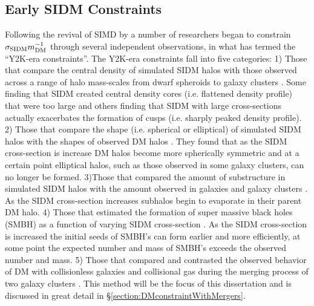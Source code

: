 \subsection{Early SIDM Constraints}

Following the revival of SIMD by \citet{Spergel:2000cb} a number of researchers began to constrain $\sigma_{\rm SIDM}m_{\rm DM}^{-1}$ through several independent observations, in what \citet{Peter:2012vi} has termed the ``Y2K-era constraints''.
The Y2K-era constraints fall into five categories:
1) Those that compare the central density of simulated SIDM halos with those observed across a range of halo mass-scales from dwarf spheroids to galaxy clusters \citep{Hogan:2000ih, Kochanek:2000iw, Yoshida:2000bd, Yoshida:2000gn, Dave:2001hh, Dalcanton:2001jj, Meneghetti:2001en, Colin:2002ku}.
Some finding that SIDM created central density cores (i.e. flattened density profile) that were too large and others finding that SIDM with large cross-sections actually exacerbates the formation of cusps (i.e. sharply peaked density profile).
2) Those that compare the shape (i.e. spherical or elliptical) of simulated SIDM halos with the shapes of observed DM halos \citep{Yoshida:2000bd, Dave:2001hh, MiraldaEscude:2002ev}.
They found that as the SIDM cross-section is increase DM halos become more spherically symmetric and at a certain point elliptical halos, such as those observed in some galaxy clusters, can no longer be formed.
3)Those that compared the amount of substructure in simulated SIDM halos with the amount observed in galaxies and galaxy clusters \citep{Hogan:2000ih, Yoshida:2000bd, Gnedin:2001gd, Colin:2002ku}.
As the SIDM cross-section increases subhalos begin to evaporate in their parent DM halo.
4) Those that estimated the formation of super massive black holes (SMBH) as a function of varying SIDM cross-section \citep{Hennawi:2002kv}.
As the SIDM cross-section is increased the initial seeds of SMBH's can form earlier and more efficiently, at some point the expected number and mass of SMBH's exceeds the observed number and mass.
5) Those that compared and contrasted the observed behavior of DM with collisionless galaxies and collisional gas during the merging process of two galaxy clusters \citep{Markevitch:2004dl}.
This method will be the focus of this dissertation and is discussed in great detail in \S\ref{section:DMconstraintWithMergers}.

